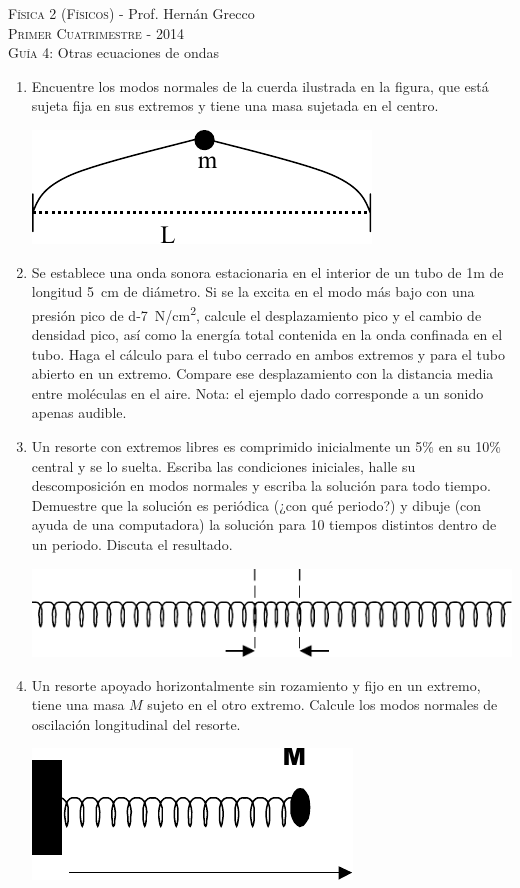 \documentclass[11pt,spanish,a4paper]{article}
\begin{document}
\begin{center}
	\textsc{\large Física 2 (Físicos)} - Prof. Hernán Grecco\\
	\textsc{\large Primer Cuatrimestre - 2014}\\
	\textsc{\large Guía 4:}	Otras ecuaciones de ondas
\end{center}

\begin{enumerate}
\item Encuentre los modos normales de la cuerda ilustrada en la figura, que está sujeta fija en sus extremos y tiene una masa sujetada en el centro.
\begin{center}
	\includegraphics[width=0.25\linewidth]{g04e01}
\end{center}


\item Se establece una onda sonora estacionaria en el interior de un tubo de 1m de longitud \SI{5}{cm} de diámetro.
	Si se la excita en el modo más bajo con una presión pico de \SI{d-7}{N/cm^2}, calcule el desplazamiento pico y el cambio de densidad pico, así como la energía total contenida en la onda confinada en el tubo.
	Haga el cálculo para el tubo cerrado en ambos extremos y para el tubo abierto en un extremo.
	Compare ese desplazamiento con la distancia media entre moléculas en el aire.
	Nota: el ejemplo dado corresponde a un sonido apenas audible.


\item Un resorte con extremos libres es comprimido inicialmente un 5\% en su 10\% central y se lo suelta.
	Escriba las condiciones iniciales, halle su descomposición en modos normales y escriba la solución para todo tiempo.
	Demuestre que la solución es periódica (¿con qué periodo?) y dibuje (con ayuda de una computadora) la solución para 10 tiempos distintos dentro de un periodo.
	Discuta el resultado.
\begin{center}
	\includegraphics[width=0.35\linewidth]{g04e03}
\end{center}


\item Un resorte apoyado horizontalmente sin rozamiento y fijo en un extremo, tiene una masa \(M\) sujeto en el otro extremo.
	Calcule los modos normales de oscilación longitudinal del resorte.
\begin{center}
	\includegraphics[width=0.2\linewidth]{g04e04}
\end{center}



\end{enumerate}
\end{document}
